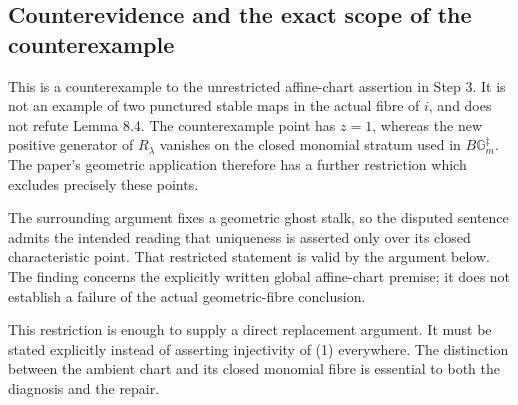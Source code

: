 \documentclass[10pt]{article}
\begin{document}
\subsection*{Counterevidence and the exact scope of the counterexample}
This is a counterexample to the unrestricted affine-chart assertion in Step 3. It is not an example of two punctured stable maps in the actual fibre of \(i\), and does not refute Lemma 8.4. The counterexample point has \(z=1\), whereas the new positive generator of \(R_\lambda\) vanishes on the closed monomial stratum used in \(B\mathbb G_m^\ddagger\). The paper’s geometric application therefore has a further restriction which excludes precisely these points.\par
The surrounding argument fixes a geometric ghost stalk, so the disputed sentence admits the intended reading that uniqueness is asserted only over its closed characteristic point. That restricted statement is valid by the argument below. The finding concerns the explicitly written global affine-chart premise; it does not establish a failure of the actual geometric-fibre conclusion.\par
This restriction is enough to supply a direct replacement argument. It must be stated explicitly instead of asserting injectivity of (1) everywhere. The distinction between the ambient chart and its closed monomial fibre is essential to both the diagnosis and the repair.\par
\end{document}
